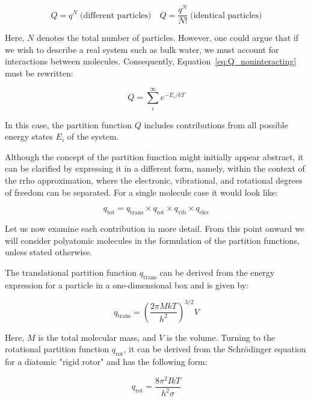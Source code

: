 \begin{equation}
    \label{eq:Q_noninteracting}
    Q = q^N \; \text{(different particles)} \quad Q = \frac{q^N}{N!} \; \text{(identical particles)}
\end{equation}

Here, $N$ denotes the total number of particles. However, one could argue that if we wish to describe a real system such as bulk water, we must account for interactions between molecules. Consequently, Equation~\ref{eq:Q_noninteracting} must be rewritten:

\begin{equation}
Q = \sum_{i}^{\infty} e^{-E_i/kT}
\end{equation}

In this case, the partition function $Q$ includes contributions from all possible energy states $E_i$ of the system.

Although the concept of the partition function might initially appear abstract, it can be clarified by expressing it in a different form, namely, within the context of the \ac{rrho} approximation, where the electronic, vibrational, and rotational degrees of freedom can be separated. For a single molecule case it would look like:

\begin{equation}
    q_{\text{tot}} = q_{\text{trans}} \times q_{\text{rot}} \times q_{\text{vib}} \times q_{\text{elec}}
\end{equation}

Let us now examine each contribution in more detail. From this point onward we will consider polyatomic molecules in the formulation of the partition functions, unless stated otherwise.

The translational partition function $q_\text{trans}$ can be derived from the energy expression for a particle in a one-dimensional box and is given by:

\begin{equation}
    q_{\text{trans}} = \left(\frac{2\pi MkT}{h^2}\right)^{3/2} V
\end{equation}

Here, $M$ is the total molecular mass, and $V$ is the volume. Turning to the rotational partition function $q_\text{rot}$, it can be derived from the Schr\"odinger equation for a diatomic "rigid rotor" and has the following form:

\begin{equation}
    q_{\text{rot}} = \frac{8\pi^2IkT}{h^2\sigma}
\end{equation}

